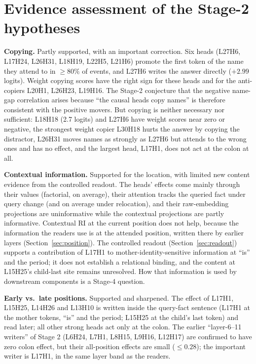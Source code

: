\documentclass[11pt,a4paper]{article}
\begin{document}
\section{Evidence assessment of the Stage-2 hypotheses}
\label{sec:hyp}
\textbf{Copying.} Partly supported, with an important correction. Six heads
(L27H6, L17H24, L26H31, L18H19, L22H5, L21H6) promote the first token of the name they
attend to in $\ge80\%$ of events, and L27H6 writes the answer directly ($+2.99$
logits).
Weight copying scores have the right sign for these heads and for the anti-copiers
L20H1, L26H23, L19H16. The Stage-2 conjecture that the negative name-gap correlation
arises because ``the causal heads copy names'' is therefore consistent with the
positive movers. But copying is neither necessary nor sufficient: L18H18 (2.7 logits)
and L27H6 have weight scores near zero or negative, the strongest weight copier L30H18
hurts the answer by copying the distractor, L26H31 moves names as strongly as L27H6 but
attends to the wrong ones and has no effect, and the largest head, L17H1, does not act
at the colon at all.

\textbf{Contextual information.} Supported for the location, with limited new
content evidence from the controlled readout.
The heads' effects come mainly through their values (factorial, on average), their
attention tracks the queried fact under query change (and on average under relocation),
and their raw-embedding projections
are uninformative while the contextual projections are partly informative. Contextual
RI at the current position does not help, because the information the readers use is
at the attended position, written there by earlier layers (Section~\ref{sec:position}).
The controlled readout (Section~\ref{sec:readout}) supports a contribution of L17H1
to mother-identity-sensitive information at ``is'' and the period; it does not
establish a relational binding, and the content at L15H25's child-last site remains
unresolved. How that information is used by downstream components is a Stage-4 question.

\textbf{Early vs.\ late positions.} Supported and sharpened. The effect of L17H1,
L15H25, L14H26 and L13H10 is written inside the query-fact sentence (L17H1 at the
mother tokens, ``is'' and the period; L15H25 at the child's last token) and read
later; all other strong heads act only at the colon. The earlier ``layer-6--11
writers'' of Stage 2 (L6H24, L7H1, L8H15, L9H16, L12H17) are confirmed to have zero
colon effect, but their all-position effects are small ($\le0.28$); the important
writer is L17H1, in the same layer band as the readers.
\end{document}
